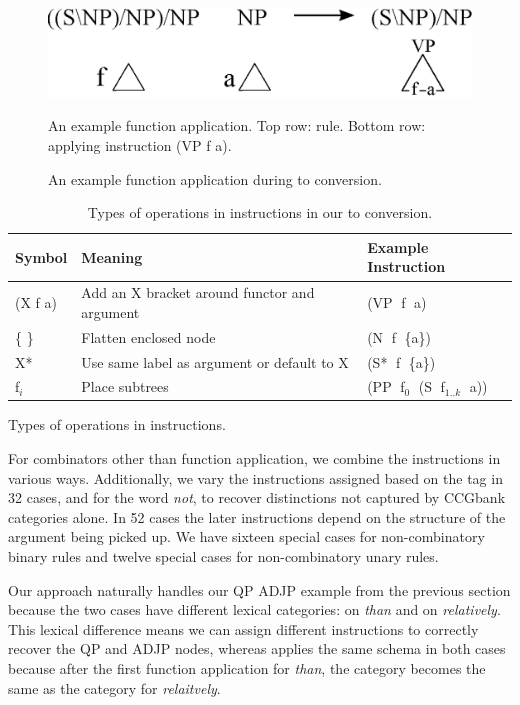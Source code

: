 \begin{figure}
\centering
\includegraphics[width=0.85\linewidth]{figures/ccg-example}
\caption{\label{fig:inst-example}
An example function application during \ccg to \ptb conversion.
}{
An example function application.
Top row: \ccg rule.
Bottom row: applying instruction (VP f a).
}
\end{figure}

\begin{table}
\centering
\begin{tabular}{lll}
	\hline
		Symbol & Meaning & Example Instruction \\
	\hline
	\hline
		(X f a) & Add an X bracket around functor and argument & (VP$\;$ f$\;$ a) \\
		\{ \} & Flatten enclosed node & (N$\;$ f$\;$ \{a\}) \\
		X* & Use same label as argument or default to X & (S*$\;$ f$\;$ \{a\}) \\
		f$_i$ & Place subtrees &  (PP$\;$ f$_0$$\;$ (S$\;$ f$_{1..k}$$\;$ a)) \\
	\hline
\end{tabular}
\caption{\label{tab:operators}
Types of operations in instructions in our \ccg to \ptb conversion.
}{
Types of operations in instructions.
}
\end{table}

For combinators other than function application, we combine the instructions in
various ways.  Additionally, we vary the instructions assigned based on the
\pos tag in 32 cases, and for the word \textit{not}, to recover distinctions
not captured by CCGbank categories alone.  In 52 cases the later
instructions depend on the structure of the argument being picked up.  We have
sixteen special cases for non-combinatory binary rules and twelve special
cases for non-combinatory unary rules.

Our approach naturally handles our QP \myvs ADJP example from the previous section because the two cases
have different lexical categories: {\small{}}
on \textit{than} and {\small {}} on \textit{relatively}.  This
lexical difference means we can assign different instructions to correctly
recover the QP and ADJP nodes, whereas \old applies the same schema in both
cases because after the first function application for \textit{than}, the category becomes the same as the category for \textit{relaitvely}.

